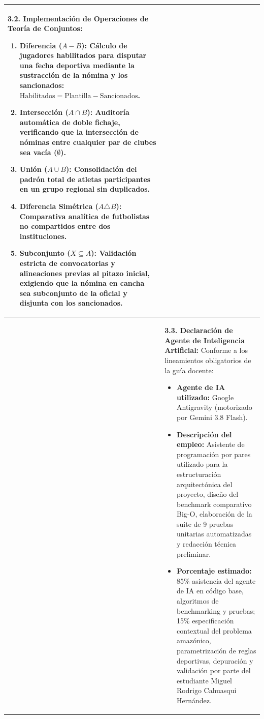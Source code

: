 \documentclass[11pt,a4paper]{article}
\begin{document}
\begin{longtable}{
    |>{\bfseries\centering\arraybackslash}p{3.2cm}|
    >{\setlength{\parindent}{0cm}\setstretch{1.12}}p{13.2cm}|
}
\textbf{3.2. Implementación de Operaciones de Teoría de Conjuntos:}\newline
\begin{enumerate}
    \item \textbf{Diferencia ($A - B$):} Cálculo de jugadores habilitados para disputar una fecha deportiva mediante la sustracción de la nómina y los sancionados: $\text{Habilitados} = \text{Plantilla} - \text{Sancionados}$.
    \item \textbf{Intersección ($A \cap B$):} Auditoría automática de doble fichaje, verificando que la intersección de nóminas entre cualquier par de clubes sea vacía ($\emptyset$).
    \item \textbf{Unión ($A \cup B$):} Consolidación del padrón total de atletas participantes en un grupo regional sin duplicados.
    \item \textbf{Diferencia Simétrica ($A \triangle B$):} Comparativa analítica de futbolistas no compartidos entre dos instituciones.
    \item \textbf{Subconjunto ($X \subseteq A$):} Validación estricta de convocatorias y alineaciones previas al pitazo inicial, exigiendo que la nómina en cancha sea subconjunto de la oficial y disjunta con los sancionados.
\end{enumerate}
\\

\hline

&
\textbf{3.3. Declaración de Agente de Inteligencia Artificial:}\newline
Conforme a los lineamientos obligatorios de la guía docente:
\begin{itemize}
    \item \textbf{Agente de IA utilizado:} Google Antigravity (motorizado por Gemini 3.8 Flash).
    \item \textbf{Descripción del empleo:} Asistente de programación por pares utilizado para la estructuración arquitectónica del proyecto, diseño del benchmark comparativo Big-O, elaboración de la suite de 9 pruebas unitarias automatizadas y redacción técnica preliminar.
    \item \textbf{Porcentaje estimado:} 85\% asistencia del agente de IA en código base, algoritmos de benchmarking y pruebas; 15\% especificación contextual del problema amazónico, parametrización de reglas deportivas, depuración y validación por parte del estudiante Miguel Rodrigo Cahuasqui Hernández.
\end{itemize}
\\


\end{longtable}
\end{document}
